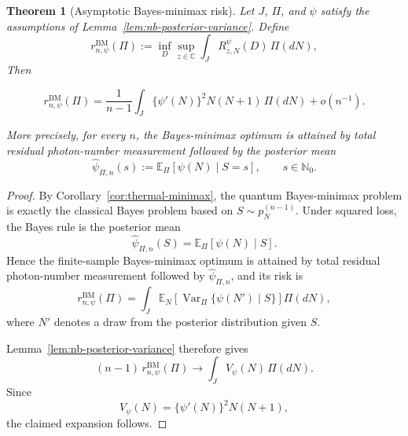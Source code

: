 \documentclass{article}
\newtheorem{theorem}{Theorem}[section]
\theoremstyle{named}
\theoremstyle{named1}
\newcommand{\E}{\mathbb{E}}
\newcommand{\Var}{\operatorname{Var}}
\newcommand{\bbC}{\mathbb C}
\newcommand{\bbR}{\mathbb R}
\newcommand{\cH}{\mathcal H}
\theoremstyle{plain}
\theoremstyle{remark}
\begin{document}
\begin{theorem}[Asymptotic Bayes-minimax risk]
\label{thm:thermal-asymptotic-bayes-risk}
Let \(J\), \(\Pi\), and \(\psi\) satisfy the assumptions of
Lemma~\ref{lem:nb-posterior-variance}. Define
\begin{equation}
    r_{n,\psi}^{\mathrm{BM}}(\Pi)
    :=
    \inf_D
    \sup_{z\in\bbC}
    \int_J
        R_{z,N}^{\psi}(D)\,
        \Pi(dN),
    \label{eq:thermal-functional-bayes-minimax-risk}
\end{equation}
Then

\begin{equation}
    r_{n,\psi}^{\mathrm{BM}}(\Pi)
    =
    \frac{1}{n-1}
    \int_J
        \{\psi'(N)\}^2N(N+1)\,
        \Pi(dN)
    +
    o(n^{-1}).
    \label{eq:thermal-asymptotic-bayes-risk}
\end{equation}

More precisely, for every \(n\), the Bayes-minimax optimum is attained
by total residual photon-number measurement followed by the posterior
mean
\begin{equation}
    \widehat\psi_{\Pi,n}(s)
    :=
    \E_\Pi[\psi(N)\mid S=s],
    \qquad s\in\mathbb N_0.
    \label{eq:thermal-posterior-mean-estimator}
\end{equation}
\end{theorem}



\begin{proof}
By Corollary~\ref{cor:thermal-minimax}, the quantum Bayes-minimax
problem is exactly the classical Bayes problem based on
$S\sim p_N^{(n-1)}$.
Under squared loss, the Bayes rule is the posterior mean
\[
    \widehat\psi_{\Pi,n}(S)
    =
    \E_\Pi[\psi(N)\mid S].
\]
Hence the finite-sample Bayes-minimax optimum is attained by total
residual photon-number measurement followed by
\(\widehat\psi_{\Pi,n}\), and its risk is
\begin{equation}
    r_{n,\psi}^{\mathrm{BM}}(\Pi)
    =
    \int_J
        \E_N
        \left[
            \Var_\Pi\{\psi(N')\mid S\}
        \right]
        \Pi(dN),
    \label{eq:thermal-bayes-risk-posterior-variance}
\end{equation}
where \(N'\) denotes a draw from the posterior distribution given \(S\).

Lemma~\ref{lem:nb-posterior-variance} therefore gives
\[
    (n-1)\,
    r_{n,\psi}^{\mathrm{BM}}(\Pi)
    \rightarrow
    \int_J
        V_\psi(N)\,
        \Pi(dN).
\]
Since
\[
    V_\psi(N)
    =
    \{\psi'(N)\}^2N(N+1),
\]
the claimed expansion follows.
\end{proof}
\end{document}
